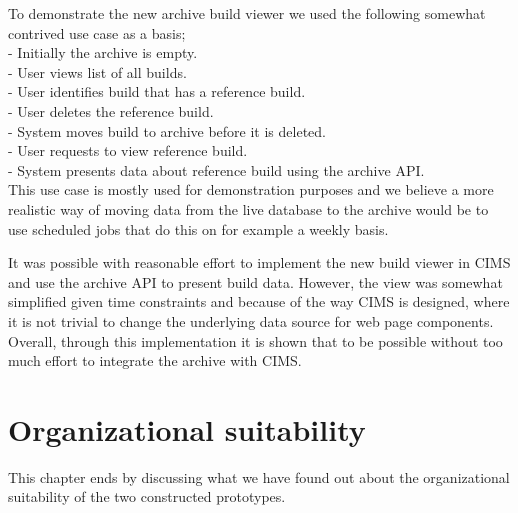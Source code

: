 To demonstrate the new archive build viewer we used the following somewhat contrived use case as a basis; \\
- Initially the archive is empty. \\
- User views list of all builds. \\
- User identifies build that has a reference build. \\
- User deletes the reference build.  \\
- System moves build to archive before it is deleted.  \\
- User requests to view reference build. \\
- System presents data about reference build using the archive API. \\

This use case is mostly used for demonstration purposes and we believe a more realistic way of moving data from the live database to the archive would be to use scheduled jobs that do this on for example a weekly basis.

It was possible with reasonable effort to implement the new build viewer in CIMS and use the archive API to present build data. However, the view was somewhat simplified given time constraints and because of the way CIMS is designed, where it is not trivial to change the underlying data source for web page components. Overall, through this implementation it is shown that to be possible without too much effort to integrate the archive with CIMS.



\section{Organizational suitability}
This chapter ends by discussing what we have found out about the organizational suitability of the two constructed prototypes.


